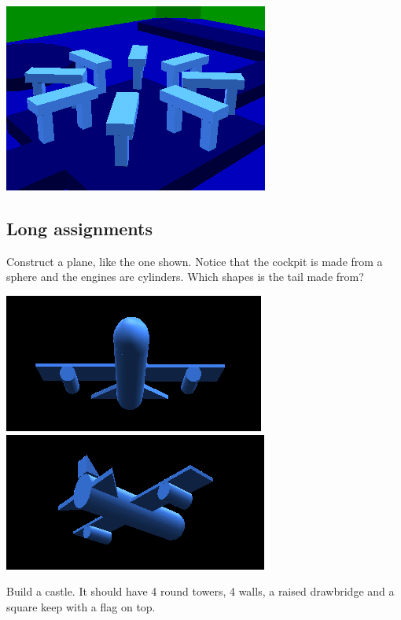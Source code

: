 \documentclass[12pt,a4paper,twoside]{article}
\renewcommand{\_}{\texttt{\symbol{95}}}
\begin{document}
\begin{numericlist}
		\begin{center}
      \includegraphics[scale=0.5,angle=0]{screenshots/3d/stone_circle}
		\end{center}
\end{numericlist}

\subsection{Long assignments}

\begin{numericlist}

\item Construct a plane, like the one shown. Notice that the
      cockpit is made from a sphere and the engines are
		cylinders. Which shapes is the tail made from?\\
		\begin{center}
		\includegraphics[scale=0.6,angle=0]{screenshots/3d/plane1}
		\includegraphics[scale=0.6,angle=0]{screenshots/3d/plane2}
		\end{center}
\item Build a castle. It should have 4 round towers, 4 walls,
      a raised drawbridge and a square keep with a flag on top.

\end{numericlist}
\end{document}
